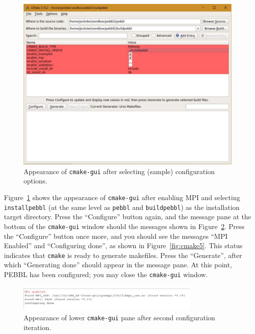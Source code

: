 \begin{figure}[tpb]
\begin{center}
\includegraphics[height=0.45\textheight]{cmake3}
\vspace{-0.3in}
\end{center}{}
\caption{Appearance of \texttt{cmake-gui} after selecting (sample)
configuration options.
  \label{fig:cmake3}}
\end{figure}

Figure~\ref{fig:cmake3} shows the appearance of \texttt{cmake-gui} after
enabling MPI and selecting \texttt{installpebbl} (at the same level as
\texttt{pebbl} and \texttt{buildpebbl}) as the installation target directory.
Press the ``Configure'' button again, and the message pane at the bottom of
the \texttt{cmake-gui} window should the messages shown in
Figure~\ref{fig:cmake4}.  Press the ``Configure'' button once more, and you
should see the messages ``MPI Enabled'' and ``Configuring done'', as shown in
Figure~\ref{fig:cmake5}.  This status indicates that \texttt{cmake} is ready
to generate makefiles.  Press the ``Generate'', after which ``Generating
done'' should appear in the message pane.  At this point, PEBBL has been
configured; you may close the \texttt{cmake-gui} window.

\begin{figure}[tpb]
\begin{center}
\includegraphics[width=0.8\textwidth]{cmake4}
\vspace{-0.3in}
\end{center}{}
\caption{Appearance of lower \texttt{cmake-gui} pane after second
configuration iteration.
  \label{fig:cmake4}}
\end{figure}

